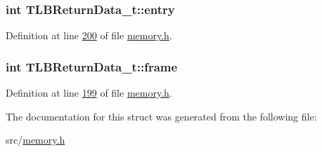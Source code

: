 \subsubsection[{\texorpdfstring{entry}{entry}}]{\setlength{\rightskip}{0pt plus 5cm}int T\+L\+B\+Return\+Data\+\_\+t\+::entry}\hypertarget{structTLBReturnData__t_a58914c8a985e6cdb2f48a56ab41a6985}{}\label{structTLBReturnData__t_a58914c8a985e6cdb2f48a56ab41a6985}


Definition at line \hyperlink{memory_8h_source_l00200}{200} of file \hyperlink{memory_8h_source}{memory.\+h}.

\subsubsection[{\texorpdfstring{frame}{frame}}]{\setlength{\rightskip}{0pt plus 5cm}int T\+L\+B\+Return\+Data\+\_\+t\+::frame}\hypertarget{structTLBReturnData__t_ac4bdfa0ee74b50048e94321426877439}{}\label{structTLBReturnData__t_ac4bdfa0ee74b50048e94321426877439}


Definition at line \hyperlink{memory_8h_source_l00199}{199} of file \hyperlink{memory_8h_source}{memory.\+h}.



The documentation for this struct was generated from the following file\+:\begin{DoxyCompactItemize}
\item 
src/\hyperlink{memory_8h}{memory.\+h}\end{DoxyCompactItemize}
